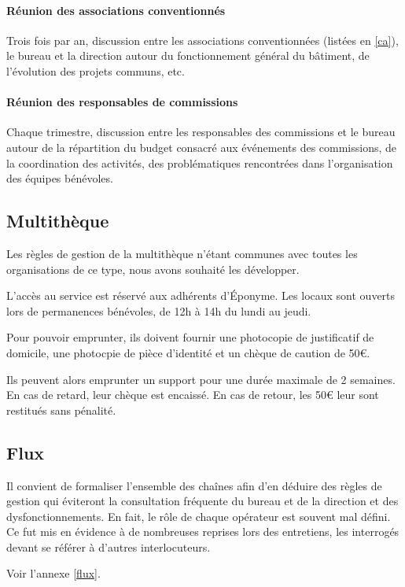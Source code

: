 \paragraph{Réunion des associations conventionnés} Trois fois par an,
discussion entre les associations conventionnées (listées en \ref{ca}),
le bureau et la direction autour du fonctionnement général du bâtiment,
de l'évolution des projets communs, etc.

\paragraph{Réunion des responsables de commissions} Chaque trimestre,
discussion entre les responsables des commissions et le bureau
autour de la répartition du budget consacré aux événements des commissions,
de la coordination des activités, des problématiques rencontrées dans
l'organisation des équipes bénévoles.

\subsection{Multithèque}
\label{multitheque}

Les règles de gestion de la multithèque n'étant communes avec toutes les
organisations de ce type, nous avons souhaité les développer.

L'accès au service est réservé aux adhérents d'Éponyme. Les locaux sont ouverts
lors de permanences bénévoles, de 12h à 14h du lundi au jeudi.

Pour pouvoir emprunter, ils doivent fournir une photocopie de justificatif de domicile,
une photocpie de pièce d'identité et un chèque de caution de 50€.

Ils peuvent alors emprunter un support pour une durée maximale de 2 semaines.
En cas de retard, leur chèque est encaissé. En cas de retour, les 50€ leur sont restitués
sans pénalité.

\subsection{Flux}

Il convient de formaliser l'ensemble des chaînes afin d'en déduire des règles
de gestion qui éviteront la consultation fréquente du bureau et de la direction
et des dysfonctionnements. En fait, le rôle de chaque opérateur est souvent
mal défini. Ce fut mis en évidence à de nombreuses reprises lors des entretiens,
les interrogés devant se référer à d'autres interlocuteurs.

Voir l'annexe \ref{flux}.